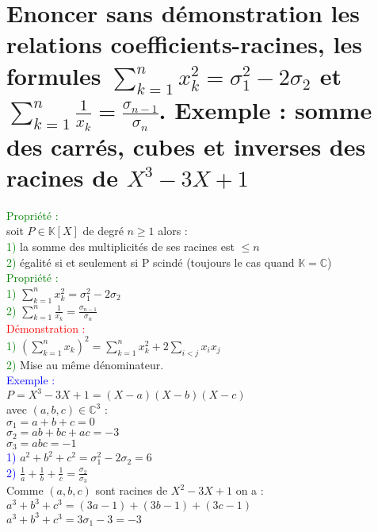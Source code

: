 \documentclass{article}
\begin{document}
\section{Enoncer sans démonstration les relations coefficients-racines, les formules $\sum_{k=1}^n x_k^2= \sigma_1^2-2 \sigma_2$ et $\sum_{k=1}^n \frac{1}{x_k}=\frac{\sigma_{n-1}}{\sigma_{n}}$. Exemple : somme des carrés, cubes et inverses des racines de $X^3-3X+1$}
\textcolor{green}{Propriété :} \\
soit $P \in \mathbb K [X]$ de degré $n \geq 1$ alors : \\
\textcolor{green}{1)} la somme des multiplicités de ses racines est $\leq n$ \\
\textcolor{green}{2)} égalité si et seulement si P scindé (toujours le cas quand $\mathbb K = \mathbb C$) \\
\textcolor{green}{Propriété :} \\
\textcolor{green}{1)} $\sum_{k=1}^n x_k^2= \sigma_1^2-2 \sigma_2$ \\
\textcolor{green}{2)} $\sum_{k=1}^n \frac{1}{x_k}=\frac{\sigma_{n-1}}{\sigma_{n}}$ \\
\textcolor{red}{Démonstration :} \\
\textcolor{green}{1)} $(\sum_{k=1}^n x_k)^2= \sum_{k=1}^n x_k^2+ 2 \sum_{i<j}x_ix_j$ \\
\textcolor{green}{2)} Mise au même dénominateur. \\
\textcolor{blue}{Exemple :} \\
$P=X^3-3X+1=(X-a)(X-b)(X-c)$ \\
avec $(a,b,c) \in \mathbb C^3$ : \\
$\sigma_1=a+b+c=0$ \\
$\sigma_2=ab+bc+ac=-3$ \\
$\sigma_3=abc=-1$ \\
\textcolor{blue}{1)} $a^2+b^2+c^2= \sigma_1^2-2\sigma_2=6$ \\
\textcolor{blue}{2)} $\frac{1}{a}+ \frac{1}{b} + \frac{1}{c}= \frac{\sigma_2}{\sigma_3}$ \\
Comme $(a,b,c)$ sont racines de $X^2-3X+1$ on a : \\
$a^3+b^3+c^3=(3a-1)+(3b-1)+(3c-1)$ \\
$a^3+b^3+c^3=3 \sigma_1 -3 =-3$
\end{document}
